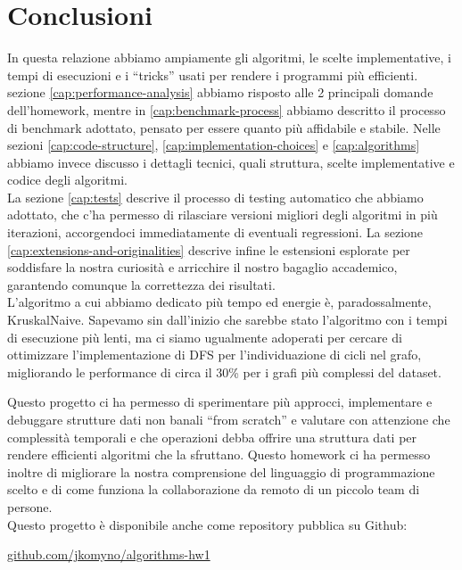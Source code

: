 \section{Conclusioni}
\label{cap:conclusions}

In questa relazione abbiamo ampiamente gli algoritmi, le scelte implementative, i tempi di esecuzioni e i ``tricks'' usati per rendere i programmi più efficienti. \\

\noindent sezione \ref{cap:performance-analysis} abbiamo risposto alle 2 principali domande dell'homework, mentre in \ref{cap:benchmark-process} abbiamo descritto il processo di benchmark adottato, pensato per essere quanto più affidabile e stabile.
Nelle sezioni \ref{cap:code-structure}, \ref{cap:implementation-choices} e \ref{cap:algorithms} abbiamo invece discusso i dettagli tecnici, quali struttura, scelte implementative e codice degli algoritmi. \\

\noindent  La sezione \ref{cap:tests} descrive il processo di testing automatico che abbiamo adottato, che c'ha permesso di rilasciare versioni migliori degli algoritmi in più iterazioni, accorgendoci immediatamente di eventuali regressioni. La sezione \ref{cap:extensions-and-originalities} descrive infine le estensioni esplorate per soddisfare la nostra curiosità e arricchire il nostro bagaglio accademico, garantendo comunque la correttezza dei risultati. \\

\noindent L'algoritmo a cui abbiamo dedicato più tempo ed energie è, paradossalmente, KruskalNaive. Sapevamo sin dall'inizio che sarebbe stato l'algoritmo con i tempi di esecuzione più lenti, ma ci siamo ugualmente adoperati per cercare di ottimizzare l'implementazione di DFS per l'individuazione di cicli nel grafo, migliorando le performance di circa il 30\% per i grafi più complessi del dataset.

\noindent Questo progetto ci ha permesso di sperimentare più approcci, implementare e debuggare strutture dati non banali ``from scratch'' e valutare con attenzione che complessità temporali e che operazioni debba offrire una struttura dati per rendere efficienti algoritmi che la sfruttano. Questo homework ci ha permesso inoltre di migliorare la nostra comprensione del linguaggio di programmazione scelto e di come funziona la collaborazione da remoto di un piccolo team di persone. \\

\noindent Questo progetto è disponibile anche come repository pubblica su Github:

\begin{center}
\href{https://github.com/jkomyno/algorithms-hw1}{github.com/jkomyno/algorithms-hw1}
\end{center}

